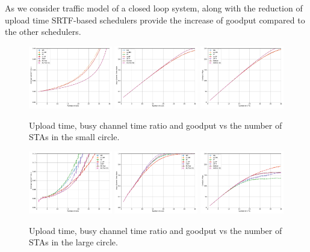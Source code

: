 As we consider traffic model of a closed loop system, along with the reduction of upload time SRTF-based schedulers provide the increase of goodput compared to the other schedulers.

\begin{figure}[tb]
  \centering
  \includegraphics[width = 0.325\textwidth]{5-d.pdf}
  \includegraphics[width = 0.325\textwidth]{5-e.pdf}
  \includegraphics[width = 0.325\textwidth]{5-t.pdf}
  \caption{\label{fig:10metres}  Upload time, busy channel time ratio and goodput vs the number of STAs in the small circle.}
\end{figure}

\begin{figure}[bt]
  \centering
  \includegraphics[width = 0.325\textwidth]{20-d.pdf}
  \includegraphics[width = 0.325\textwidth]{20-e.pdf}
  \includegraphics[width = 0.325\textwidth]{20-t.pdf}
  \caption{\label{fig:20metres} Upload time, busy channel time ratio and goodput vs the number of STAs in the large circle.}
\end{figure}

